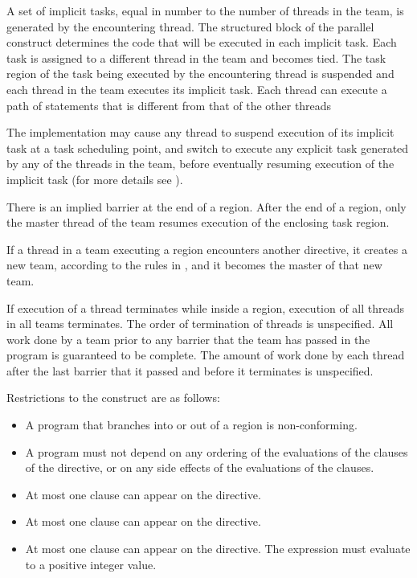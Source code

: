 A set of implicit tasks, equal in number to the number of threads in the team, is 
generated by the encountering thread. The structured block of the parallel construct 
determines the code that will be executed in each implicit task. Each task is assigned to 
a different thread in the team and becomes tied. The task region of the task being 
executed by the encountering thread is suspended and each thread in the team executes 
its implicit task. Each thread can execute a path of statements that is different from that 
of the other threads

The implementation may cause any thread to suspend execution of its implicit task at a 
task scheduling point, and switch to execute any explicit task generated by any of the 
threads in the team, before eventually resuming execution of the implicit task (for more 
details see ).

There is an implied barrier at the end of a  region. After the end of a 
 region, only the master thread of the team resumes execution of the 
enclosing task region.

If a thread in a team executing a  region encounters another  
directive, it creates a new team, according to the rules in 
, 
and it becomes the master of that new team.

If execution of a thread terminates while inside a  region, execution of all 
threads in all teams terminates. The order of termination of threads is unspecified. All 
work done by a team prior to any barrier that the team has passed in the program is 
guaranteed to be complete. The amount of work done by each thread after the last 
barrier that it passed and before it terminates is unspecified.

\restrictions
Restrictions to the  construct are as follows:

\begin{itemize}
\item A program that branches into or out of a  region is non-conforming.

\item A program must not depend on any ordering of the evaluations of the clauses of the 
 directive, or on any side effects of the evaluations of the clauses.

\item At most one  clause can appear on the directive.

\item At most one  clause can appear on the directive.

\item At most one  clause can appear on the directive. The  
expression must evaluate to a positive integer value.
\end{itemize}

